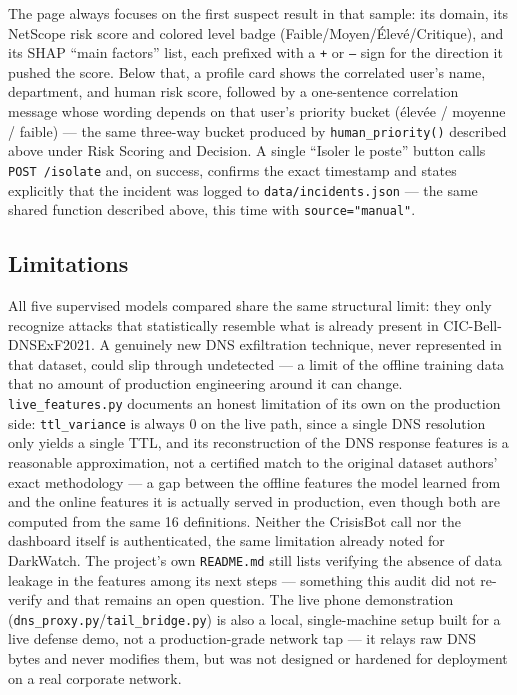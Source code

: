 \documentclass[12pt,a4paper]{report}
\begin{document}
The page always focuses on the first suspect result in that sample: its domain, its NetScope risk score and colored level badge (Faible/Moyen/Élevé/Critique), and its SHAP ``main factors'' list, each prefixed with a \texttt{+} or \texttt{--} sign for the direction it pushed the score. Below that, a profile card shows the correlated user's name, department, and human risk score, followed by a one-sentence correlation message whose wording depends on that user's priority bucket (élevée / moyenne / faible) --- the same three-way bucket produced by \texttt{human\_priority()} described above under Risk Scoring and Decision. A single ``Isoler le poste'' button calls \texttt{POST /isolate} and, on success, confirms the exact timestamp and states explicitly that the incident was logged to \texttt{data/incidents.json} --- the same shared function described above, this time with \texttt{source="manual"}.

\subsection*{Limitations}
All five supervised models compared share the same structural limit: they only recognize attacks that statistically resemble what is already present in CIC-Bell-DNSExF2021. A genuinely new DNS exfiltration technique, never represented in that dataset, could slip through undetected --- a limit of the offline training data that no amount of production engineering around it can change. \texttt{live\_features.py} documents an honest limitation of its own on the production side: \texttt{ttl\_variance} is always 0 on the live path, since a single DNS resolution only yields a single TTL, and its reconstruction of the DNS response features is a reasonable approximation, not a certified match to the original dataset authors' exact methodology --- a gap between the offline features the model learned from and the online features it is actually served in production, even though both are computed from the same 16 definitions. Neither the CrisisBot call nor the dashboard itself is authenticated, the same limitation already noted for DarkWatch. The project's own \texttt{README.md} still lists verifying the absence of data leakage in the features among its next steps --- something this audit did not re-verify and that remains an open question. The live phone demonstration (\texttt{dns\_proxy.py}/\texttt{tail\_bridge.py}) is also a local, single-machine setup built for a live defense demo, not a production-grade network tap --- it relays raw DNS bytes and never modifies them, but was not designed or hardened for deployment on a real corporate network.
\end{document}
